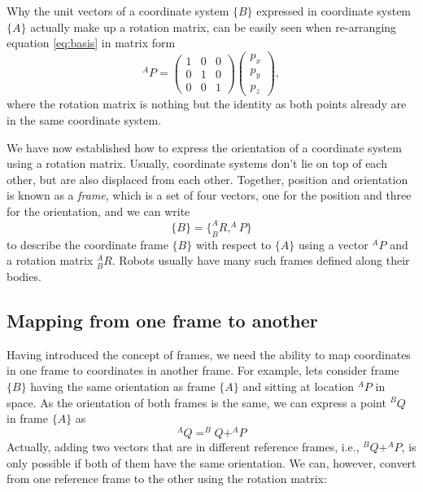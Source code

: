 Why the unit vectors of a coordinate system $\{B\}$ expressed in coordinate system $\{A\}$ actually make up a rotation matrix, can be easily seen when re-arranging equation \ref{eq:basis} in matrix form
\begin{equation}
^AP=\left(\begin{array}{ccc}1 & 0 & 0\\0 & 1 & 0\\0 & 0 & 1\end{array}\right)\left(\begin{array}{c}p_x\\p_y\\p_z\end{array}\right),
\end{equation}
where the rotation matrix is nothing but the identity as both points already are in the same coordinate system. 

We have now established how to express the orientation of a coordinate system using a rotation matrix. Usually, coordinate systems don't lie on top of each other, but are also displaced from each other. 
Together, position and orientation is known as a \emph{frame}, which is a set of four vectors, one for the position and three for the orientation, and we can write
%
\begin{equation}
\{B\}=\{^A_BR, ^AP\}
\end{equation}
%
to describe the coordinate frame $\{B\}$ with respect to $\{A\}$ using a vector $^AP$ and a rotation matrix $^A_BR$. Robots usually have many such frames defined along their bodies.

\subsection{Mapping from one frame to another}
Having introduced the concept of frames, we need the ability to map coordinates in one frame to coordinates in another frame. For example, lets consider frame $\{B\}$ having the same orientation as frame $\{A\}$ and sitting at location $^AP$ in space. As the orientation of both frames is the same, we can express a point $ ^BQ$ in frame $\{A\}$ as
%
\begin{equation}
^AQ=^BQ+^AP
\end{equation}
%
Actually, adding two vectors that are in different reference frames, i.e., $ ^BQ+^AP$, is only possible if both of them have the same orientation. We can, however, convert from one reference frame to the other using the rotation matrix:

